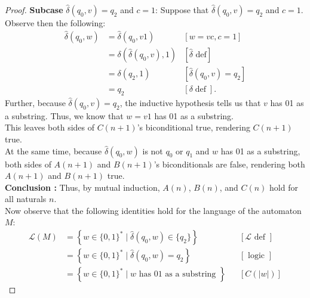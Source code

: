 \documentclass[10pt]{article}
\begin{document}
\begin{enumerate}[label={}]
\begin{proof}
              \textbf{Subcase }$\hat{\delta}\left(q_0, v\right)=q_2$ and $c=1$: Suppose that $\hat{\delta}\left(q_0, v\right)=q_2$ and $c=1$. Observe then the following:
              $$
                  \begin{aligned}
                      \hat{\delta}\left(q_0, w\right) & =\hat{\delta}\left(q_0, v 1\right)                     & {[w=v c, c=1] }                                     \\
                                                      & =\delta\left(\hat{\delta}\left(q_0, v\right), 1\right) & {[\hat{\delta} \text { def}] }                      \\
                                                      & =\delta\left(q_2, 1\right)                             & {\left[\hat{\delta}\left(q_0, v\right)=q_2\right] } \\
                                                      & =q_2                                                   & {[\delta \operatorname{def}] . }
                  \end{aligned}
              $$
              Further, because $\hat{\delta}\left(q_0, v\right)=q_2$, the inductive hypothesis tells us that $v$ has 01 as a substring. Thus, we know that $w=v1$ has 01 as a substring.\\
              This leaves both sides of $C(n+1)$'s biconditional true, rendering $C(n+1)$ true.\\
              At the same time, because $\hat{\delta}\left(q_0, w\right)$ is not $q_0$ or $q_1$ and $w$ has 01 as a substring, both sides of $A(n+1)$ and $B(n+1)$'s biconditionals are false, rendering both $A(n+1)$ and $B(n+1)$ true.\\
              \textbf{Conclusion :} Thus, by mutual induction, $A(n)$, $B(n)$, and $C(n)$ hold for all naturals $n$.\\
              Now observe that the following identities hold for the language of the automaton $M$:
              $$
                  \begin{aligned}
                      \mathcal{L}(M) & =\left\{w \in\{0, 1\}^* \mid \hat{\delta}(q_0, w) \in\{q_2\}\right\}   &  & {[\mathcal{L} \text { def }] } \\
                                     & =\left\{w \in\{0, 1\}^* \mid \hat{\delta}(q_0, w)=q_2\right\}          &  & {[\text { logic }] }           \\
                                     & =\left\{w \in\{0, 1\}^* \mid w \text { has 01 as a substring }\right\} &  & {[C(|w|)] }
                  \end{aligned}
              $$


\end{proof}
\end{enumerate}
\end{document}
